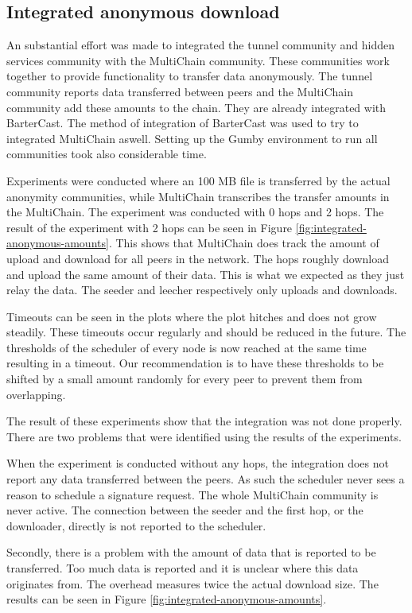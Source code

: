 \subsection{Integrated anonymous download}
An substantial effort was made to integrated the tunnel community and hidden services community with the MultiChain community.
These communities work together to provide functionality to transfer data anonymously.
The tunnel community reports data transferred between peers and the MultiChain community add these amounts to the chain.
They are already integrated with BarterCast.
The method of integration of BarterCast was used to try to integrated MultiChain aswell.
Setting up the Gumby environment to run all communities took also considerable time.

Experiments were conducted where an 100 MB file is transferred by the actual anonymity communities,
while MultiChain transcribes the transfer amounts in the MultiChain.
The experiment was conducted with 0 hops and 2 hops.
The result of the experiment with 2 hops can be seen in Figure \ref{fig:integrated-anonymous-amounts}.
This shows that MultiChain does track the amount of upload and download for all peers in the network.
The hops roughly download and upload the same amount of their data.
This is what we expected as they just relay the data.
The seeder and leecher respectively only uploads and downloads.

Timeouts can be seen in the plots where the plot hitches and does not grow steadily.
These timeouts occur regularly and should be reduced in the future.
The thresholds of the scheduler of every node is now reached at the same time resulting in a timeout.
Our recommendation is to have these thresholds to be shifted by a small amount randomly for every peer
to prevent them from overlapping.

The result of these experiments show that the integration was not done properly.
There are two problems that were identified using the results of the experiments.

When the experiment is conducted without any hops,
the integration does not report any data transferred between the peers.
As such the scheduler never sees a reason to schedule a signature request.
The whole MultiChain community is never active.
The connection between the seeder and the first hop,
or the downloader, directly is not reported to the scheduler.

Secondly, there is a problem with the amount of data that is reported to be transferred.
Too much data is reported and it is unclear where this data originates from.
The overhead measures twice the actual download size.
The results can be seen in Figure \ref{fig:integrated-anonymous-amounts}.

